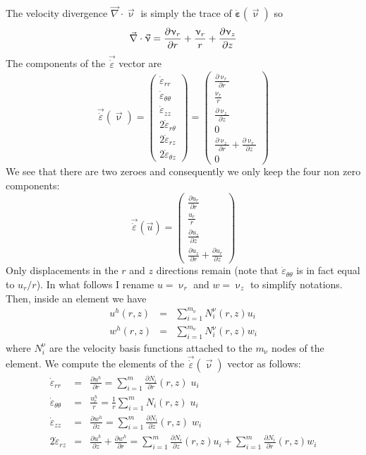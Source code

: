 The velocity divergence $\vec\nabla \cdot \vec{\upnu}$ is simply the trace of $\dot{\bm \varepsilon}(\vec{\upnu})$ so 
\[
\vec\nabla \cdot \vec{\upnu}
= {\partial \upnu_r \over \partial r} +{\upnu_r \over r}
+{\partial \upnu_{z} \over \partial z}
\]
The components of the $\vec{\dot{\varepsilon}}$ vector are
\[
\vec{\dot{\varepsilon}}(\vec \upnu)
=
\left(
\begin{array}{c}
\dot\varepsilon_{rr} \\
\dot\varepsilon_{\theta\theta} \\
\dot\varepsilon_{zz} \\
2\dot\varepsilon_{r\theta} \\
2\dot\varepsilon_{rz} \\
2\dot\varepsilon_{\theta z} 
\end{array}
\right)
=
\left(
\begin{array}{c}
\frac{\partial \upnu_r}{\partial r} \\ 
\frac{\upnu_r}{r} \\ 
\frac{\partial \upnu_z}{\partial z} \\ 
0 \\ 
\frac{\partial \upnu_z}{\partial r}+\frac{\partial \upnu_r}{\partial z} \\ 
0
\end{array}
\right)
\]
We see that there are two zeroes and consequently
we only keep the four non zero components:
\[
\vec{\dot{\varepsilon}}(\vec u)
=
\left(
\begin{array}{c}
\frac{\partial u_r}{\partial r} \\ 
\frac{u_r}{r} \\ 
\frac{\partial u_z}{\partial z} \\ 
\frac{\partial u_z}{\partial r}+\frac{\partial u_r}{\partial z} 
\end{array}
\right)
\]
Only displacements in the $r$ and $z$ directions remain (note that $\dot\varepsilon_{\theta\theta}$ is in fact equal to $u_r/r$). In what follows I rename $u=\upnu_r$ and $w=\upnu_z$ to simplify notations. 
Then, inside an element we have 
\begin{eqnarray}
u^h(r,z) &=& \sum_{i=1}^{m_\upnu} N_i^\upnu(r,z) u_i \nonumber\\
w^h(r,z) &=& \sum_{i=1}^{m_\upnu} N_i^\upnu(r,z) w_i
\end{eqnarray}
where $N_i^\upnu$ are the velocity basis functions attached 
to the $m_\upnu$ nodes of the element.
We compute the elements of the $\vec{\dot{\varepsilon}}(\vec\upnu)$ vector as follows:
\begin{eqnarray}
\dot\varepsilon_{rr} &=&
\frac{\partial u^h}{\partial r} 
= \sum_{i=1}^m \frac{\partial N_i}{\partial r}(r,z) \; u_i \\
\dot\varepsilon_{\theta\theta} &=& \frac{u_r^h}{r} = 
\frac{1}{r}\sum_{i=1}^m N_i(r,z) \;  u_i \\
\dot\varepsilon_{zz} &=& 
\frac{\partial w^h}{\partial z}
= \sum_{i=1}^m \frac{\partial N_i}{\partial z}(r,z) \; w_i \\
2\dot\varepsilon_{rz} &=& \frac{\partial u^h}{\partial z}
+ \frac{\partial w^h}{\partial r}
= \sum_{i=1}^m \frac{\partial N_i}{\partial z}(r,z) u_i 
+ \sum_{i=1}^m \frac{\partial N_i}{\partial r}(r,z) w_i 
\end{eqnarray}
